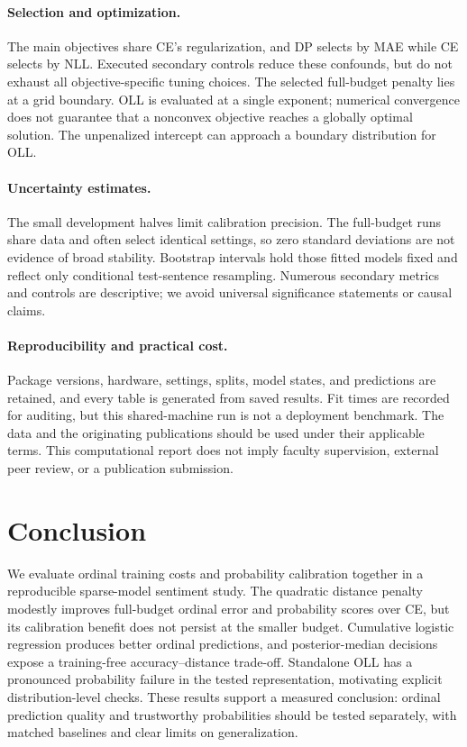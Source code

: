 \documentclass[10pt,twocolumn]{article}
\begin{document}
\paragraph{Selection and optimization.} The main objectives share CE's regularization, and DP selects by MAE while CE selects by NLL. Executed secondary controls reduce these confounds, but do not exhaust all objective-specific tuning choices. The selected full-budget penalty lies at a grid boundary. OLL is evaluated at a single exponent; numerical convergence does not guarantee that a nonconvex objective reaches a globally optimal solution. The unpenalized intercept can approach a boundary distribution for OLL.

\paragraph{Uncertainty estimates.} The small development halves limit calibration precision. The full-budget runs share data and often select identical settings, so zero standard deviations are not evidence of broad stability. Bootstrap intervals hold those fitted models fixed and reflect only conditional test-sentence resampling. Numerous secondary metrics and controls are descriptive; we avoid universal significance statements or causal claims.

\paragraph{Reproducibility and practical cost.} Package versions, hardware, settings, splits, model states, and predictions are retained, and every table is generated from saved results. Fit times are recorded for auditing, but this shared-machine run is not a deployment benchmark. The data and the originating publications should be used under their applicable terms. This computational report does not imply faculty supervision, external peer review, or a publication submission.

\section{Conclusion}
We evaluate ordinal training costs and probability calibration together in a reproducible sparse-model sentiment study. The quadratic distance penalty modestly improves full-budget ordinal error and probability scores over CE, but its calibration benefit does not persist at the smaller budget. Cumulative logistic regression produces better ordinal predictions, and posterior-median decisions expose a training-free accuracy--distance trade-off. Standalone OLL has a pronounced probability failure in the tested representation, motivating explicit distribution-level checks. These results support a measured conclusion: ordinal prediction quality and trustworthy probabilities should be tested separately, with matched baselines and clear limits on generalization.
\end{document}
